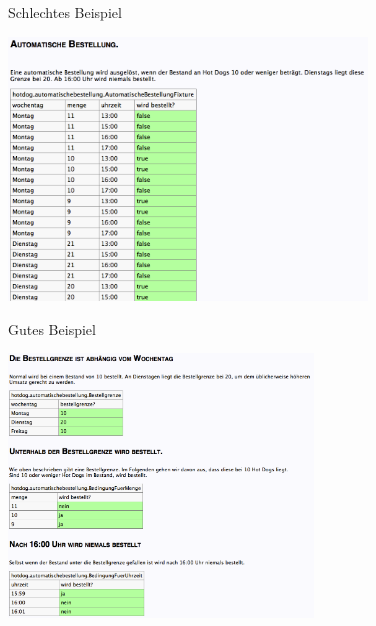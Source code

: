 \begin{frame}{Schlechtes Beispiel}

\begin{center}
\includegraphics[height=7cm]{SchlechtesBeispiel.png} \newline
\end{center}

\end{frame}

\begin{frame}{Gutes Beispiel}

\begin{center}
\includegraphics[height=7cm]{GutesBeispiel.png} \newline
\end{center}

\end{frame}

